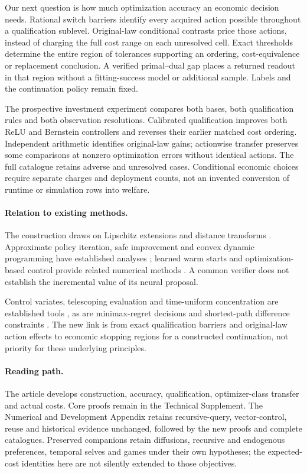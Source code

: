 \documentclass[ecta,nameyear,draft]{econsocart}
\begin{document}
Our next question is how much optimization accuracy an economic decision needs. Rational switch barriers identify every acquired action possible throughout a qualification sublevel. Original-law conditional contrasts price those actions, instead of charging the full cost range on each unresolved cell. Exact thresholds determine the entire region of tolerances supporting an ordering, cost-equivalence or replacement conclusion. A verified primal--dual gap places a returned readout in that region without a fitting-success model or additional sample. Labels and the continuation policy remain fixed.

The prospective investment experiment compares both bases, both qualification rules and both observation resolutions. Calibrated qualification improves both ReLU and Bernstein controllers and reverses their earlier matched cost ordering. Independent arithmetic identifies original-law gains; actionwise transfer preserves some comparisons at nonzero optimization errors without identical actions. The full catalogue retains adverse and unresolved cases. Conditional economic choices require separate charges and deployment counts, not an invented conversion of runtime or simulation rows into welfare.

\paragraph{Relation to existing methods.}
The construction draws on Lipschitz extensions and distance transforms \citep{mcshane1934,felzenszwalb2012}. Approximate policy iteration, safe improvement and convex dynamic programming have established analyses \citep{munos2003,pirotta2013,scherrer2015,yang2020convex}; learned warm starts and optimization-based control provide related numerical methods \citep{sakaue2023warm,sambharya2023,agrawal2020control}. A common verifier does not establish the incremental value of its neural proposal.

Control variates, telescoping evaluation and time-uniform concentration are established tools \citep{munos2006variance,jiang2016,howard2020time,karampatziakis2021}, as are minimax-regret decisions and shortest-path difference constraints \citep{manski2004,floyd1962}. The new link is from exact qualification barriers and original-law action effects to economic stopping regions for a constructed continuation, not priority for these underlying principles.

\paragraph{Reading path.}
The article develops construction, accuracy, qualification, optimizer-class transfer and actual costs. Core proofs remain in the Technical Supplement. The Numerical and Development Appendix retains recursive-query, vector-control, reuse and historical evidence unchanged, followed by the new proofs and complete catalogues. Preserved companions retain diffusions, recursive and endogenous preferences, temporal selves and games under their own hypotheses; the expected-cost identities here are not silently extended to those objectives.
\end{document}
